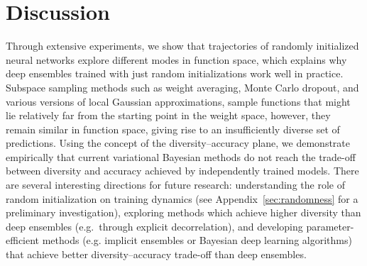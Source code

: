 \documentclass{article}
\begin{document}
%
%
%
%
%
%
%


%
%
%


%
%
%
%
%
%
%
%
%
%
%
%
%
%
%
%
%
%
%
%
%
%
%


%
%


%
%
%
%
%
%
%
%
%
%
%
%
%
%
%
%
%

%
%
%
%
%
%
%
%
%
%
%
%
%
%
%
%
%
%
%



%
%
%
%
%
%
%
%
%

%
%
%
%
%
%
%
%
%
%
%
%



%
%
%



%
%
%
%
%
%
%
%
%
%
%
%
%
%
%
%


%

%

%
 
%

%



%
%

%

%
 
%
%
%
%
%
%
    
%
%
%
%
%

%
%
%
%
%
%
%
%
%
%

%
%
%
%
%

%
%
%
%
%
%
%
%
%
%
%
%
%
%
%
%
%
%
%
%
%
%
%
%
%
%
%
%


%
%
%
%
%
%
%
%
%
%
%
%
%
%
%
%
%
%
%
%
%
%
%
%
%
%
%
%


%
%
%
%
%
%
%
%
%
%

%
%
%
%
%
%
%
%
%
%


%
%
%
%
%
%
%
%
%
%
\section{Discussion} 
Through extensive experiments, we show that trajectories of randomly initialized neural networks explore different modes in function space, which explains why deep ensembles trained with just random initializations work well in practice. %
Subspace sampling methods such as weight averaging, Monte Carlo dropout, and various versions of local Gaussian approximations, sample functions that might lie relatively far from the starting point in the weight space, however, they remain similar %
in function space, giving rise to an insufficiently diverse set of predictions. Using the concept of the diversity--accuracy plane, we demonstrate empirically that current variational Bayesian methods do not reach the trade-off between diversity and accuracy achieved by independently trained models. %
There are several interesting directions for future research: understanding the role of random initialization on training dynamics (see Appendix~\ref{sec:randomness} for a preliminary investigation), exploring methods which achieve higher diversity than deep ensembles (e.g.~through explicit decorrelation), and developing parameter-efficient  methods (e.g. implicit ensembles or Bayesian deep learning algorithms) that achieve better diversity--accuracy trade-off than deep ensembles. %
\end{document}
